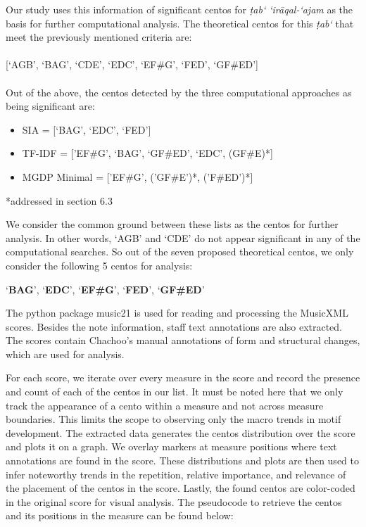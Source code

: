 \documentclass{article}
\begin{document}
Our study uses this information of significant centos for \textit{ṭab‘ ‘irāqal-‘ajam} as the basis for further computational analysis. The theoretical centos for this \textit{ṭab‘} that meet the previously mentioned criteria are:\\
\\
\small[‘AGB’, ‘BAG’, ‘CDE’, ‘EDC’, ‘EF\#G’, ‘FED’, ‘GF\#ED’]\\
\\Out of the above, the centos detected by the three computational approaches as being significant are:
\begin{itemize}\small
    \item SIA = [`BAG', `EDC', `FED']
    \item TF-IDF = ['EF\#G', `BAG', `GF\#ED', `EDC', (GF\#E)*]
    \item MGDP Minimal = ['EF\#G', ('GF\#E')*, ('F\#ED')*]
\end{itemize}
\begin{center}
\tiny {*}addressed in section 6.3
\end{center}
\normalsize
We consider the common ground between these lists as the centos for further analysis. In other words, ‘AGB’ and ‘CDE’ do not appear significant in any of the computational searches. So out of the seven proposed theoretical centos, we only consider the following 5 centos for analysis:
\begin{center}
    ‘\textbf{BAG}’, ‘\textbf{EDC}’, ‘\textbf{EF\#G}’, ‘\textbf{FED}’, ‘\textbf{GF\#ED}’
\end{center}

The python package music21\cite{music21} is used for reading and processing the MusicXML scores. Besides the note information, staff text annotations are also extracted. The scores contain Chachoo’s manual annotations of form and structural changes, which are used for analysis.

For each score, we iterate over every measure in the score and record the presence and count of each of the centos in our list. It must be noted here that we only track the appearance of a cento within a measure and not across measure boundaries. This limits the scope to observing only the macro trends in motif development. The extracted data generates the centos distribution over the score and plots it on a graph. We overlay markers at measure positions where text annotations are found in the score. These distributions and plots are then used to infer noteworthy trends in the repetition, relative importance, and relevance of the placement of the centos in the score. Lastly, the found centos are color-coded in the original score for visual analysis. The pseudocode to retrieve the centos and its positions in the measure can be found below:
\end{document}
